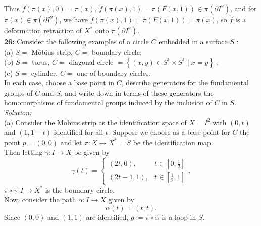 \documentclass[a4paper]{article}
\begin{document}
    Thus $\tilde{f}(\pi (x),0) = \pi(x)$,
    $\tilde{f}\left( \pi (x),1 \right) 
    = \pi \left( F(x,1) \right) \in \pi \left( \partial I^2 \right) $, and
    for $\pi(x) \in \pi \left( \partial I^2 \right) $, we have
    $\tilde{f}\left( \pi (x), 1 \right) 
    = \pi \left( F(x,1) \right) 
    = \pi(x)$, so $\tilde{f}$ is a deformation retraction of
    $X^{*}$ onto $\pi \left( \partial I^2 \right) $.\\
    \linebreak
    \textbf{26:} Consider the following examples of a circle $C$ embedded in
    a surface $S$ :\\
    (a) $S =$ Möbius strip, $C=$ boundary circle;\\
    (b) $S =$ torus, $C=$ diagonal circle $=\left\{ \left( x,y \right) 
    \in S^{1} \times S^{1}  \mid x=y \right\} $ ;\\
    (c) $S =$ cylinder, $C=$ one of boundary circles.\\
    \linebreak
    In each case, choose a base point in $C$, describe generators for the
    fundamental groups of $C$ and $S$, and write down in terms of these
    generators the homomorphisms of fundamental groups induced by the inclusion
    of $C$ in $S$.\\
    \linebreak
    \textit{Solution:} \\
    (a) Consider the Möbius strip as the identification space of
    $X = I^2$ with $(0,t)$ and $(1,1-t)$ identified for all $t$. Suppose we choose
    as a base point for $C$ the point
    $p = (0,0)$ and let $\pi  \colon X \to X^{*} = S$ be the identification map.\\
    \linebreak
    Then letting $\gamma  \colon I \to X$ be given by
     \[
    \gamma(t) = \begin{cases}
        (2t,0), & t \in \left[ 0, \frac{1}{2} \right] \\
        (2t-1, 1), & t\in \left[ \frac{1}{2},1 \right] 
    \end{cases},
    \] 
    $\pi \circ \gamma  \colon I \to X^{*}$ is the boundary circle.\\
    \linebreak
    Now, consider the path $\alpha  \colon I \to X$ given by
    \[
    \alpha (t) = (t, t).
    \] 
    Since $(0,0)$ and $(1,1)$ are identified, 
    $ g := \pi \circ \alpha$ is a loop in $S$.\\
    \linebreak
\end{document}
